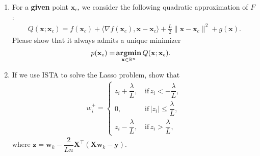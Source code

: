 \documentclass[11pt,letter,notitlepage]{article}
\DeclareMathOperator*{\argmin}{\bf argmin}
\begin{document}
\begin{exercise}
\begin{enumerate}[resume]
    \item For a \textbf{given} point $\textbf{x}_c$, we consider the following quadratic approximation of $F$:
    \begin{align*}
       Q(\mathbf{x};\mathbf{x}_c)=f(\mathbf{x}_c)+\langle\nabla f(\mathbf{x}_c),\mathbf{x}-\mathbf{x}_c\rangle+\frac{L}{2}\|\mathbf{x}-\mathbf{x}_c\|^2+g(\mathbf{x}).
    \end{align*}
    Please show that it always admits a unique minimizer
    \begin{align*}
       p(\mathbf{x}_c)=&\argmin_{\textbf{x}\in\mathbb{R}^n}Q(\mathbf{x};\mathbf{x}_c).
    \end{align*}



    \item If we use ISTA to solve the Lasso problem, show that
    \begin{align*}
        w_i^+=
        \begin{cases}
            z_i+\dfrac{\lambda}{L},\,&\text{if}\,z_i<-\dfrac{\lambda}{L},\\
            0,\,&\text{if}\,|z_i|\le\dfrac{\lambda}{L},\\
            z_i-\dfrac{\lambda}{L},\,&\text{if}\,z_i>\dfrac{\lambda}{L},
        \end{cases}
    \end{align*}
    where $\textbf{z}=\textbf{w}_k-\dfrac{2}{Ln}\textbf{X}^\top(\textbf{X}\textbf{w}_k-\textbf{y})$.

  
    

\end{enumerate}

\end{exercise}
\begin{solution}

\end{solution}

\clearpage{$ $}
\end{document}
